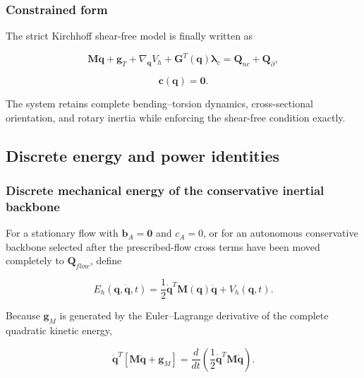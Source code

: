 \subsubsection{Constrained form}\label{sec:galerkin-2-8-2}

The strict Kirchhoff shear-free model is finally written as

\begin{equation}
\label{eq:galerkin-2-99}
\mathbf{M}\ddot{\mathbf{q}} + \mathbf{g}_{T} + \nabla_{\mathbf{q}}V_{h} + \mathbf{G}^{T}\left( \mathbf{q} \right)\bm{\lambda}_{c} = \mathbf{Q}_{nc} + \mathbf{Q}_{\partial},
\end{equation}

\begin{equation}
\label{eq:galerkin-2-100}
\mathbf{c}\left( \mathbf{q} \right) = \mathbf{0}.
\end{equation}

The system retains complete bending--torsion dynamics, cross-sectional orientation, and rotary inertia while enforcing the shear-free condition exactly.

\subsection{Discrete energy and power identities}\label{sec:galerkin-2-9}

\subsubsection{Discrete mechanical energy of the conservative inertial backbone}\label{sec:galerkin-2-9-1}

For a stationary flow with \(\mathbf{b}_{A} = \mathbf{0}\) and \(c_{A} = 0\), or for an autonomous conservative backbone selected after the prescribed-flow cross terms have been moved completely to \(\mathbf{Q}_{flow}\), define

\begin{equation}
\label{eq:galerkin-2-101}
E_{h}\left( \mathbf{q},\dot{\mathbf{q}},t \right) = \frac{1}{2}{\dot{\mathbf{q}}}^{T}\mathbf{M}\left( \mathbf{q} \right)\dot{\mathbf{q}} + V_{h}\left( \mathbf{q},t \right).
\end{equation}

Because \(\mathbf{g}_{M}\) is generated by the Euler--Lagrange derivative of the complete quadratic kinetic energy,

\begin{equation}
\label{eq:galerkin-2-102}
{\dot{\mathbf{q}}}^{T}\left\lbrack \mathbf{M}\ddot{\mathbf{q}} + \mathbf{g}_{M} \right\rbrack = \frac{d}{dt}\left( \frac{1}{2}{\dot{\mathbf{q}}}^{T}\mathbf{M}\dot{\mathbf{q}} \right).
\end{equation}

